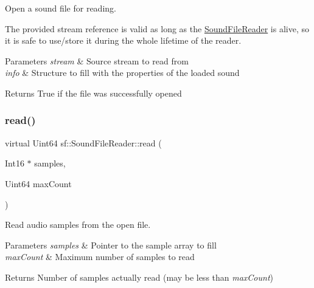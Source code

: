 Open a sound file for reading. 

The provided stream reference is valid as long as the \mbox{\hyperlink{classsf_1_1_sound_file_reader}{Sound\+File\+Reader}} is alive, so it is safe to use/store it during the whole lifetime of the reader.


\begin{DoxyParams}{Parameters}
{\em stream} & Source stream to read from \\
\hline
{\em info} & Structure to fill with the properties of the loaded sound\\
\hline
\end{DoxyParams}
\begin{DoxyReturn}{Returns}
True if the file was successfully opened \begin{DoxyVerb}\end{DoxyVerb}
 
\end{DoxyReturn}
\mbox{\label{classsf_1_1_sound_file_reader_a3b7d86769ea07e24e7b0f0486bed7591}} 
\subsubsection{\texorpdfstring{read()}{read()}}
{\footnotesize\ttfamily virtual Uint64 sf\+::\+Sound\+File\+Reader\+::read (\begin{DoxyParamCaption}\item[{Int16 $\ast$}]{samples,  }\item[{Uint64}]{max\+Count }\end{DoxyParamCaption})\hspace{0.3cm}{\ttfamily [pure virtual]}}



Read audio samples from the open file. 


\begin{DoxyParams}{Parameters}
{\em samples} & Pointer to the sample array to fill \\
\hline
{\em max\+Count} & Maximum number of samples to read\\
\hline
\end{DoxyParams}
\begin{DoxyReturn}{Returns}
Number of samples actually read (may be less than {\itshape max\+Count}) \begin{DoxyVerb}\end{DoxyVerb}
 
\end{DoxyReturn}
\mbox{\label{classsf_1_1_sound_file_reader_a1e18ade5ffe882bdfa20a2ebe7e2b015}} 
